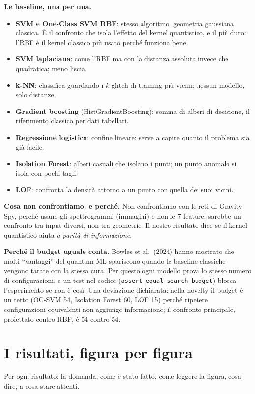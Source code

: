 \textbf{Le baseline, una per una.}
\begin{itemize}
  \item \textbf{SVM e One-Class SVM RBF}: stesso algoritmo, geometria gaussiana classica. È il confronto che isola
  l’effetto del kernel quantistico, e il più duro: l’RBF è il kernel classico più usato perché funziona bene.
  \item \textbf{SVM laplaciana}: come l’RBF ma con la distanza assoluta invece che quadratica; meno liscia.
  \item \textbf{k-NN}: classifica guardando i $k$ glitch di training più vicini; nessun modello, solo distanze.
  \item \textbf{Gradient boosting} (HistGradientBoosting): somma di alberi di decisione, il riferimento classico per dati
  tabellari.
  \item \textbf{Regressione logistica}: confine lineare; serve a capire quanto il problema sia già facile.
  \item \textbf{Isolation Forest}: alberi casuali che isolano i punti; un punto anomalo si isola con pochi tagli.
  \item \textbf{LOF}: confronta la densità attorno a un punto con quella dei suoi vicini.
\end{itemize}

\textbf{Cosa non confrontiamo, e perché.} Non confrontiamo con le reti di Gravity Spy, perché usano gli spettrogrammi
(immagini) e non le 7 feature: sarebbe un confronto tra input diversi, non tra geometrie. Il nostro risultato dice se il
kernel quantistico aiuta \emph{a parità di informazione}.

\textbf{Perché il budget uguale conta.} Bowles et al.\ (2024) hanno mostrato che molti “vantaggi” del quantum ML
spariscono quando le baseline classiche vengono tarate con la stessa cura. Per questo ogni modello prova lo stesso
numero di configurazioni, e un test nel codice (\texttt{assert\_equal\_search\_budget}) blocca l’esperimento se non è
così. Una deviazione dichiarata: nella novelty il budget è un tetto (OC-SVM 54, Isolation Forest 60, LOF 15) perché
ripetere configurazioni equivalenti non aggiunge informazione; il confronto principale, proiettato contro RBF, è 54
contro 54.

\section{I risultati, figura per figura}

Per ogni risultato: la domanda, come è stato fatto, come leggere la figura, cosa dire, a cosa stare attenti.

